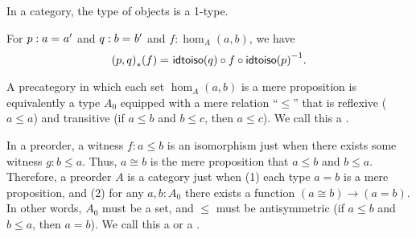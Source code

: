 \documentclass[hott-all.tex]{subfiles}
\begin{document}

\begin{lem}\label{ct:obj-1type}
  In a category, the type of objects is a 1-type.
\end{lem}


\begin{lem}\label{ct:idtoiso-trans}
  For $p:a =_{} a'$ and $q:b =_{} b'$ and $f:\hom_A(a,b)$, we have
  \begin{equation}\label{ct:idtoisocompute}
    \id{\trans{(p,q)}{f}}
    {\idtoiso(q)\circ f \circ \inv{\idtoiso(p)}}.
  \end{equation}
\end{lem}


\begin{eg}\label{ct:orders}
  A precategory in which each set $\hom_A(a,b)$ is a mere proposition is equivalently a type $A_0$ equipped with a mere relation ``$\le$'' that is reflexive ($a\le a$) and transitive (if $a\le b$ and $b\le c$, then $a\le c$).
  We call this a .

  In a preorder, a witness $f: a\le b$ is an isomorphism just when there exists some witness $g: b\le a$.
  Thus, $a\cong b$ is the mere proposition that $a\le b$ and $b\le a$.
  Therefore, a preorder $A$ is a category just when (1) each type $a=b$ is a mere proposition, and (2) for any $a,b:A_0$ there exists a function $(a\cong b) \to (a=b)$.
  In other words, $A_0$ must be a set, and $\le$ must be antisymmetric (if $a\le b$ and $b\le a$, then $a=b$).
  We call this a  or a .
\end{eg}
\end{document}
